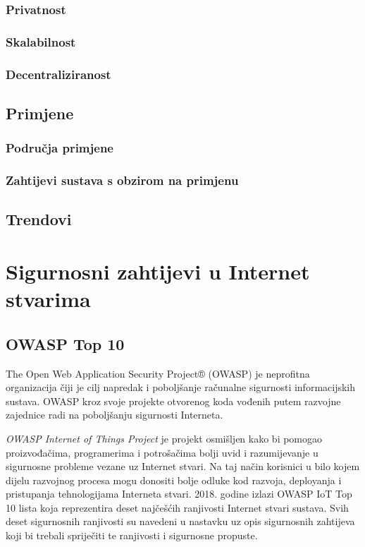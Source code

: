 \documentclass[times, utf8, diplomski]{fer}
\begin{document}
\subsection{Privatnost}

\subsection{Skalabilnost}

\subsection{Decentraliziranost}

\section{Primjene}

\subsection{Područja primjene}

\subsection{Zahtijevi sustava s obzirom na primjenu}

\section{Trendovi}


\chapter{Sigurnosni zahtijevi u Internet stvarima}

\section{OWASP Top 10}
The Open Web Application Security Project® (OWASP) je neprofitna organizacija čiji je cilj napredak i poboljšanje računalne sigurnosti informacijskih sustava. OWASP kroz svoje projekte otvorenog koda vođenih putem razvojne zajednice radi na poboljšanju sigurnosti Interneta.

\emph{OWASP Internet of Things Project} je projekt osmišljen kako bi pomogao proizvođačima, programerima i potrošačima bolji uvid i razumijevanje u sigurnosne probleme vezane uz Internet stvari. Na taj način korisnici u bilo kojem dijelu razvojnog procesa mogu donositi bolje odluke kod razvoja, deployanja i pristupanja tehnologijama Interneta stvari.\citep{owasp1} 2018. godine izlazi OWASP IoT Top 10 lista koja reprezentira deset najčešćih ranjivosti Internet stvari sustava. Svih deset sigurnosnih ranjivosti su navedeni u nastavku uz opis sigurnosnih zahtijeva koji bi trebali spriječiti te ranjivosti i sigurnosne propuste. 
\end{document}
